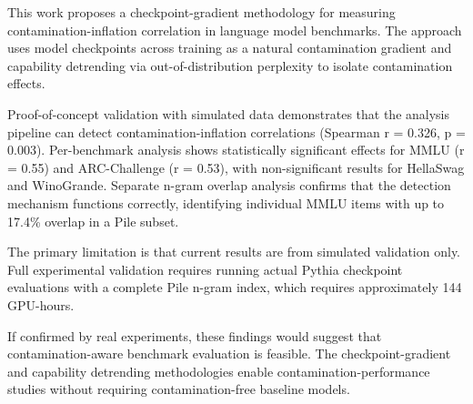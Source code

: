 
This work proposes a checkpoint-gradient methodology for measuring contamination-inflation correlation in language model benchmarks. The approach uses model checkpoints across training as a natural contamination gradient and capability detrending via out-of-distribution perplexity to isolate contamination effects.

Proof-of-concept validation with simulated data demonstrates that the analysis pipeline can detect contamination-inflation correlations (Spearman r = 0.326, p = 0.003). Per-benchmark analysis shows statistically significant effects for MMLU (r = 0.55) and ARC-Challenge (r = 0.53), with non-significant results for HellaSwag and WinoGrande. Separate n-gram overlap analysis confirms that the detection mechanism functions correctly, identifying individual MMLU items with up to 17.4\% overlap in a Pile subset.

The primary limitation is that current results are from simulated validation only. Full experimental validation requires running actual Pythia checkpoint evaluations with a complete Pile n-gram index, which requires approximately 144 GPU-hours.

If confirmed by real experiments, these findings would suggest that contamination-aware benchmark evaluation is feasible. The checkpoint-gradient and capability detrending methodologies enable contamination-performance studies without requiring contamination-free baseline models.

